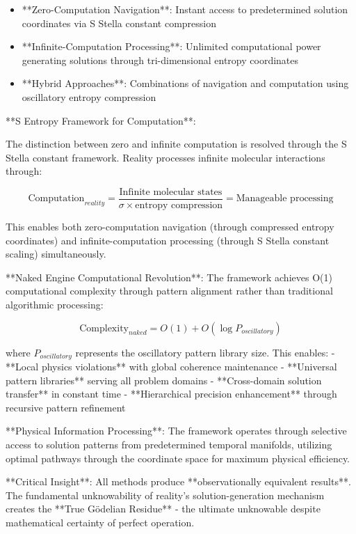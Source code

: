 \documentclass[12pt,a4paper]{article}
\theoremstyle{remark}
\begin{document}
\begin{itemize}
\item **Zero-Computation Navigation**: Instant access to predetermined solution coordinates via S Stella constant compression
\item **Infinite-Computation Processing**: Unlimited computational power generating solutions through tri-dimensional entropy coordinates
\item **Hybrid Approaches**: Combinations of navigation and computation using oscillatory entropy compression
\end{itemize}

**S Entropy Framework for Computation**:

The distinction between zero and infinite computation is resolved through the S Stella constant framework. Reality processes infinite molecular interactions through:

\begin{equation}
\text{Computation}_{reality} = \frac{\text{Infinite molecular states}}{\sigma \times \text{entropy compression}} = \text{Manageable processing}
\end{equation}

This enables both zero-computation navigation (through compressed entropy coordinates) and infinite-computation processing (through S Stella constant scaling) simultaneously.

**Naked Engine Computational Revolution**: The framework achieves O(1) computational complexity through pattern alignment rather than traditional algorithmic processing:

\begin{equation}
\text{Complexity}_{naked} = O(1) + O(\log P_{oscillatory})
\end{equation}

where $P_{oscillatory}$ represents the oscillatory pattern library size. This enables:
- **Local physics violations** with global coherence maintenance
- **Universal pattern libraries** serving all problem domains  
- **Cross-domain solution transfer** in constant time
- **Hierarchical precision enhancement** through recursive pattern refinement

**Physical Information Processing**: The framework operates through selective access to solution patterns from predetermined temporal manifolds, utilizing optimal pathways through the coordinate space for maximum physical efficiency.

**Critical Insight**: All methods produce **observationally equivalent results**. The fundamental unknowability of reality's solution-generation mechanism creates the **True Gödelian Residue** - the ultimate unknowable despite mathematical certainty of perfect operation.
\end{document}
